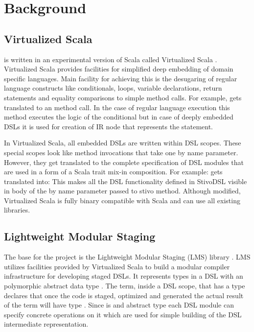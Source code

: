 \section{Background}
\label{sec:background}

\subsection{Virtualized Scala}
\label{subsec:virtualized-scala}
\tool is written in an experimental version of Scala called Virtualized Scala \cite{sv}. Virtualized Scala provides facilities for simplified deep embedding of domain specific languages. Main facility for achieving this is the desugaring of regular language constructs like conditionals, loops, variable declarations, return statements and equality comparisons to simple method calls. For example,  gets translated to an  method call. In the case of regular language execution this method executes the logic of the conditional but in case of deeply embedded DSLs it is used for creation of  IR node that represents the  statement.  

In Virtualized Scala, all embedded DSLs are written within DSL scopes. These special scopes look like method invocations that take one by name parameter. However, they get translated to the complete specification of DSL modules that are used in a form of a Scala trait mix-in composition. For example: 
 gets translated into:
This makes all the DSL functionality defined in StivoDSL visible in body of the by name parameter passed to stivo method. 
Although modified, Virtualized Scala is fully binary compatible with Scala and can use all existing libraries.  


\subsection{Lightweight Modular Staging}
\label{subsec:lightweight-modular-staging}

The base for the \tool project is the Lightweight Modular Staging (LMS) library \cite{rompf_lightweight_2010}. LMS utilizes facilities provided by Virtualized Scala to build a modular compiler infrastructure for developing staged DSLs. It represents types in a DSL with an polymorphic abstract data type . The term, inside a DSL scope, that has a type  declares that once the code is staged, optimized and generated the actual result of the term will have type .  Since  is and abstract type each DSL module can specify concrete operations on it which are used for simple building of the DSL intermediate representation. 

